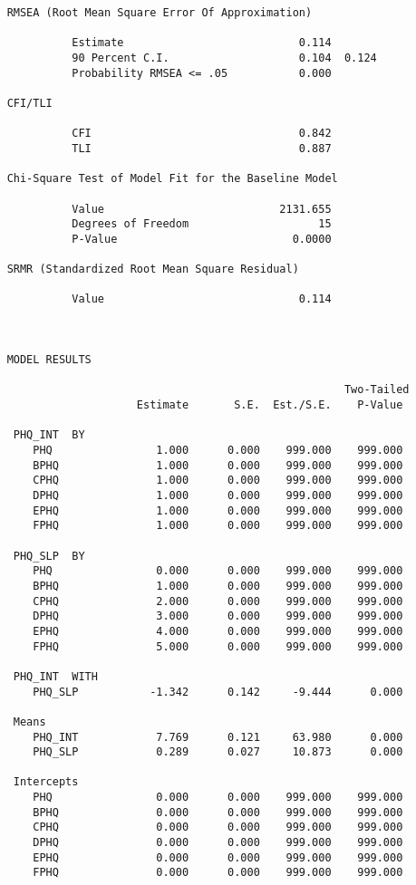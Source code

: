 \documentclass[11pt]{article}
\begin{document}
\begin{verbatim}
    RMSEA (Root Mean Square Error Of Approximation)
    
              Estimate                           0.114
              90 Percent C.I.                    0.104  0.124
              Probability RMSEA <= .05           0.000
    
    CFI/TLI
    
              CFI                                0.842
              TLI                                0.887
    
    Chi-Square Test of Model Fit for the Baseline Model
    
              Value                           2131.655
              Degrees of Freedom                    15
              P-Value                           0.0000
    
    SRMR (Standardized Root Mean Square Residual)
    
              Value                              0.114
    
    
    
    MODEL RESULTS
    
                                                        Two-Tailed
                        Estimate       S.E.  Est./S.E.    P-Value
    
     PHQ_INT  BY
        PHQ                1.000      0.000    999.000    999.000
        BPHQ               1.000      0.000    999.000    999.000
        CPHQ               1.000      0.000    999.000    999.000
        DPHQ               1.000      0.000    999.000    999.000
        EPHQ               1.000      0.000    999.000    999.000
        FPHQ               1.000      0.000    999.000    999.000
    
     PHQ_SLP  BY
        PHQ                0.000      0.000    999.000    999.000
        BPHQ               1.000      0.000    999.000    999.000
        CPHQ               2.000      0.000    999.000    999.000
        DPHQ               3.000      0.000    999.000    999.000
        EPHQ               4.000      0.000    999.000    999.000
        FPHQ               5.000      0.000    999.000    999.000
    
     PHQ_INT  WITH
        PHQ_SLP           -1.342      0.142     -9.444      0.000
    
     Means
        PHQ_INT            7.769      0.121     63.980      0.000
        PHQ_SLP            0.289      0.027     10.873      0.000
    
     Intercepts
        PHQ                0.000      0.000    999.000    999.000
        BPHQ               0.000      0.000    999.000    999.000
        CPHQ               0.000      0.000    999.000    999.000
        DPHQ               0.000      0.000    999.000    999.000
        EPHQ               0.000      0.000    999.000    999.000
        FPHQ               0.000      0.000    999.000    999.000
    

\end{verbatim}
\end{document}
